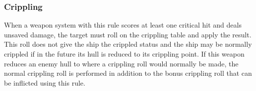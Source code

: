 \subsubsection{Crippling}
When a weapon system with this rule scores at least one critical hit and deals unsaved damage, the target must roll on the crippling table and apply the result. This roll does not give the ship the crippled status and the ship may be normally crippled if in the future its hull is reduced to its crippling point. If this weapon reduces an enemy hull to where a crippling roll would normally be made, the normal crippling roll is performed in addition to the bonus crippling roll that can be inflicted using this rule.